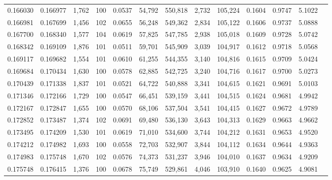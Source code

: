 \begin{tabular}{rrrrrrrrrrrrr}
0.166030 & 0.166977 & 1,762 & 100 &                                     0.0537 &  54,792 & 550,818 &   2,732 & 105,224 & 0.1604 & 0.9747 & 5.1022 \\
0.166981 & 0.167699 & 1,456 & 102 &                                     0.0655 &  56,248 & 549,362 &   2,834 & 105,122 & 0.1606 & 0.9737 & 5.0888 \\
0.167700 & 0.168340 & 1,577 & 104 &                                     0.0619 &  57,825 & 547,785 &   2,938 & 105,018 & 0.1609 & 0.9728 & 5.0742 \\
0.168342 & 0.169109 & 1,876 & 101 &                                     0.0511 &  59,701 & 545,909 &   3,039 & 104,917 & 0.1612 & 0.9718 & 5.0568 \\
0.169117 & 0.169682 & 1,554 & 101 &                                     0.0610 &  61,255 & 544,355 &   3,140 & 104,816 & 0.1615 & 0.9709 & 5.0424 \\
0.169684 & 0.170434 & 1,630 & 100 &                                     0.0578 &  62,885 & 542,725 &   3,240 & 104,716 & 0.1617 & 0.9700 & 5.0273 \\
0.170439 & 0.171338 & 1,837 & 101 &                                     0.0521 &  64,722 & 540,888 &   3,341 & 104,615 & 0.1621 & 0.9691 & 5.0103 \\
0.171346 & 0.172166 & 1,729 & 100 &                                     0.0547 &  66,451 & 539,159 &   3,441 & 104,515 & 0.1624 & 0.9681 & 4.9942 \\
0.172167 & 0.172847 & 1,655 & 100 &                                     0.0570 &  68,106 & 537,504 &   3,541 & 104,415 & 0.1627 & 0.9672 & 4.9789 \\
0.172852 & 0.173487 & 1,374 & 102 &                                     0.0691 &  69,480 & 536,130 &   3,643 & 104,313 & 0.1629 & 0.9663 & 4.9662 \\
0.173495 & 0.174209 & 1,530 & 101 &                                     0.0619 &  71,010 & 534,600 &   3,744 & 104,212 & 0.1631 & 0.9653 & 4.9520 \\
0.174212 & 0.174982 & 1,693 & 100 &                                     0.0558 &  72,703 & 532,907 &   3,844 & 104,112 & 0.1634 & 0.9644 & 4.9363 \\
0.174983 & 0.175748 & 1,670 & 102 &                                     0.0576 &  74,373 & 531,237 &   3,946 & 104,010 & 0.1637 & 0.9634 & 4.9209 \\
0.175748 & 0.176415 & 1,376 & 100 &                                     0.0678 &  75,749 & 529,861 &   4,046 & 103,910 & 0.1640 & 0.9625 & 4.9081 \\

\end{tabular}
